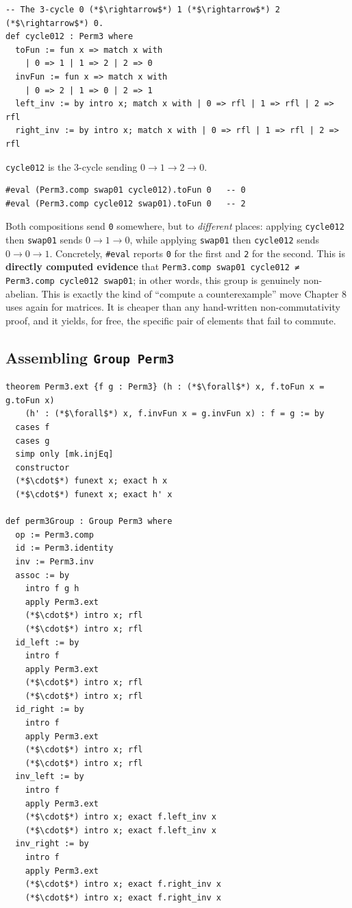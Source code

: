 \begin{lstlisting}
-- The 3-cycle 0 (*$\rightarrow$*) 1 (*$\rightarrow$*) 2 (*$\rightarrow$*) 0.
def cycle012 : Perm3 where
  toFun := fun x => match x with
    | 0 => 1 | 1 => 2 | 2 => 0
  invFun := fun x => match x with
    | 0 => 2 | 1 => 0 | 2 => 1
  left_inv := by intro x; match x with | 0 => rfl | 1 => rfl | 2 => rfl
  right_inv := by intro x; match x with | 0 => rfl | 1 => rfl | 2 => rfl
\end{lstlisting}

\texttt{cycle012} is the 3-cycle sending \(0 \to 1 \to 2 \to 0\).

\begin{lstlisting}
#eval (Perm3.comp swap01 cycle012).toFun 0   -- 0
#eval (Perm3.comp cycle012 swap01).toFun 0   -- 2
\end{lstlisting}

Both compositions send \texttt{0} somewhere, but to \emph{different} places: applying \texttt{cycle012} then \texttt{swap01} sends \(0 \to 1 \to 0\), while applying \texttt{swap01} then \texttt{cycle012} sends \(0 \to 0 \to 1\). Concretely, \texttt{\#eval} reports \texttt{0} for the first and \texttt{2} for the second. This is \textbf{directly computed evidence} that \texttt{Perm3.comp swap01 cycle012 ≠ Perm3.comp cycle012 swap01}; in other words, this group is genuinely non-abelian. This is exactly the kind of ``compute a counterexample'' move Chapter 8 uses again for matrices. It is cheaper than any hand-written non-commutativity proof, and it yields, for free, the specific pair of elements that fail to commute.

\subsection{\texorpdfstring{Assembling \texttt{Group\ Perm3}}{Assembling Group Perm3}}\label{sec:06-groups:04-permutations-example:5}

\begin{lstlisting}
theorem Perm3.ext {f g : Perm3} (h : (*$\forall$*) x, f.toFun x = g.toFun x)
    (h' : (*$\forall$*) x, f.invFun x = g.invFun x) : f = g := by
  cases f
  cases g
  simp only [mk.injEq]
  constructor
  (*$\cdot$*) funext x; exact h x
  (*$\cdot$*) funext x; exact h' x

def perm3Group : Group Perm3 where
  op := Perm3.comp
  id := Perm3.identity
  inv := Perm3.inv
  assoc := by
    intro f g h
    apply Perm3.ext
    (*$\cdot$*) intro x; rfl
    (*$\cdot$*) intro x; rfl
  id_left := by
    intro f
    apply Perm3.ext
    (*$\cdot$*) intro x; rfl
    (*$\cdot$*) intro x; rfl
  id_right := by
    intro f
    apply Perm3.ext
    (*$\cdot$*) intro x; rfl
    (*$\cdot$*) intro x; rfl
  inv_left := by
    intro f
    apply Perm3.ext
    (*$\cdot$*) intro x; exact f.left_inv x
    (*$\cdot$*) intro x; exact f.left_inv x
  inv_right := by
    intro f
    apply Perm3.ext
    (*$\cdot$*) intro x; exact f.right_inv x
    (*$\cdot$*) intro x; exact f.right_inv x
\end{lstlisting}

